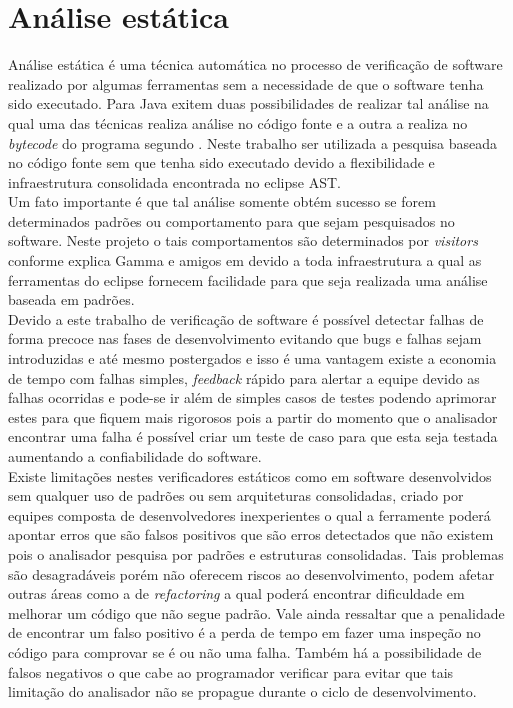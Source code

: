 \chapter{Análise estática}

Análise estática é uma técnica automática no processo de verificação de software realizado por algumas ferramentas sem a necessidade de que o software tenha sido executado. Para Java exitem duas possibilidades de realizar tal análise na qual uma das técnicas realiza análise no código fonte e a outra a realiza no {\it bytecode} do programa segundo \cite{Ayewah:2008:USA:1439186.1439221}. Neste trabalho ser utilizada a pesquisa baseada no código fonte sem que tenha sido executado devido a flexibilidade e infraestrutura consolidada encontrada no eclipse AST.\\

Um fato importante é que tal análise somente obtém sucesso se forem determinados padrões ou comportamento para que sejam pesquisados no software. Neste projeto o tais comportamentos são determinados por {\it visitors} conforme explica Gamma e amigos em  \cite{Gamma:1995:DPE:186897} devido a toda infraestrutura a qual as ferramentas do eclipse fornecem facilidade para que seja realizada uma análise baseada em padrões.\\

Devido a este trabalho de verificação de software é possível detectar falhas de forma precoce nas fases de  desenvolvimento evitando que bugs e falhas sejam introduzidas e até mesmo postergados e isso é uma vantagem existe a economia de tempo com falhas simples, {\it  feedback} rápido para alertar a equipe devido as falhas ocorridas e pode-se ir além de simples casos de testes podendo aprimorar estes para que  fiquem mais rigorosos pois a partir do momento que o analisador encontrar uma falha é possível criar um teste de caso para que esta seja testada aumentando a confiabilidade do software.\\

Existe limitações nestes verificadores estáticos como em software desenvolvidos sem qualquer uso de padrões ou sem arquiteturas consolidadas, criado por equipes composta de desenvolvedores inexperientes o qual a ferramente poderá apontar erros que são falsos positivos que são erros detectados que não existem pois o analisador pesquisa por padrões e estruturas consolidadas. Tais problemas são desagradáveis porém não oferecem riscos ao desenvolvimento, podem afetar outras áreas como a de {\it refactoring} a qual poderá encontrar dificuldade em melhorar um código que não segue padrão. Vale ainda ressaltar que a penalidade de encontrar um falso positivo é a perda de tempo em fazer uma inspeção no código para comprovar se é ou não uma falha. Também há a possibilidade de falsos negativos o que cabe ao programador verificar para evitar que tais limitação do analisador não se propague durante o ciclo de desenvolvimento.\\